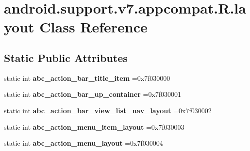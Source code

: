 \hypertarget{classandroid_1_1support_1_1v7_1_1appcompat_1_1R_1_1layout}{}\section{android.\+support.\+v7.\+appcompat.\+R.\+layout Class Reference}
\label{classandroid_1_1support_1_1v7_1_1appcompat_1_1R_1_1layout}
\subsection*{Static Public Attributes}
\begin{DoxyCompactItemize}
\item 
\mbox{\label{classandroid_1_1support_1_1v7_1_1appcompat_1_1R_1_1layout_acdad7f72e480472a0e3d2c259f0d7294}} 
static int {\bfseries abc\+\_\+action\+\_\+bar\+\_\+title\+\_\+item} =0x7f030000
\item 
\mbox{\label{classandroid_1_1support_1_1v7_1_1appcompat_1_1R_1_1layout_a52626c0ed66d07f37047ac6b30ae41f8}} 
static int {\bfseries abc\+\_\+action\+\_\+bar\+\_\+up\+\_\+container} =0x7f030001
\item 
\mbox{\label{classandroid_1_1support_1_1v7_1_1appcompat_1_1R_1_1layout_ad58e62703c3bba296db60ece871452bf}} 
static int {\bfseries abc\+\_\+action\+\_\+bar\+\_\+view\+\_\+list\+\_\+nav\+\_\+layout} =0x7f030002
\item 
\mbox{\label{classandroid_1_1support_1_1v7_1_1appcompat_1_1R_1_1layout_a56745a02e02209cef96d1025d18cad59}} 
static int {\bfseries abc\+\_\+action\+\_\+menu\+\_\+item\+\_\+layout} =0x7f030003
\item 
\mbox{\label{classandroid_1_1support_1_1v7_1_1appcompat_1_1R_1_1layout_a0fe4f4590a85e0e0c95b2df197d3cd19}} 
static int {\bfseries abc\+\_\+action\+\_\+menu\+\_\+layout} =0x7f030004
\item 
\mbox{\label{classandroid_1_1support_1_1v7_1_1appcompat_1_1R_1_1layout_a4f33ea734f763259c6a44569aed4a406}} 

\end{DoxyCompactItemize}
